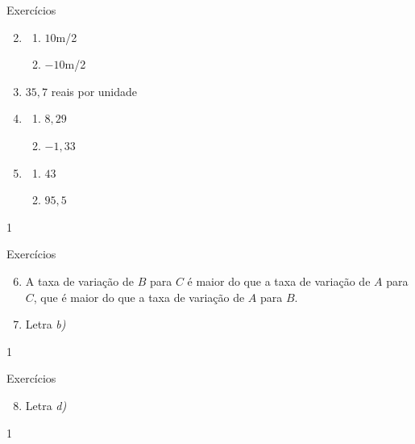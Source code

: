 \clearmargin
\begin{answer}{Exercícios}
{\exerciselist
	\begin{enumerate}\setcounter{enumi}{1}
	\item 
	\begin{enumerate}
	\item $10$m/2 
	\item $-10$m/2
	\end{enumerate}
	\item $35{,}7$ reais por unidade
	\item
	\begin{enumerate}
	\item $8{,}29$
	\item $-1{,}33$
	\end{enumerate}
	\item 
	\begin{enumerate}
	\item $43$
	\item $95{,}5$
	\end{enumerate}

	\end{enumerate}
}{1}
\end{answer}
\clearmargin
\begin{answer}{Exercícios}
{\exerciselist
	\begin{enumerate}\setcounter{enumi}{5}
	\item A taxa de variação de $B$ para $C$ é maior do que a taxa de variação de $A$ para $C$, que é maior do que a taxa de variação de $A$ para $B$.
	\item Letra \textit{b)}
	\end{enumerate}
}{1}
\end{answer}
\clearmargin
\begin{answer}{Exercícios}
{\exerciselist
	\begin{enumerate}\setcounter{enumi}{7}
	\item Letra \textit{d)}
	\end{enumerate}
}{1}
\end{answer}

